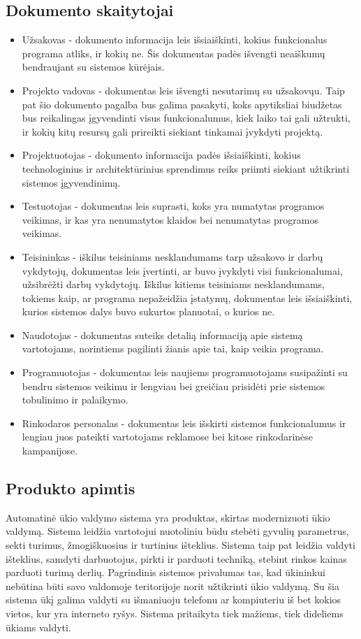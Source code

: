 \documentclass[oneside]{VUMIFPSkursinis}
\begin{document}
\subsection{Dokumento skaitytojai}
\begin{itemize}
	\item Užsakovas - dokumento informacija leis išsiaiškinti, kokius funkcionalus programa atliks, ir kokių ne. Šis dokumentas padės išvengti neaiškumų bendraujant su sistemos kūrėjais.
	\item Projekto vadovas - dokumentas leis išvengti nesutarimų su užsakovųu. Taip pat šio dokumento pagalba bus galima pasakyti, koks apytiksliai biudžetas bus reikalingas įgyvendinti visus funkcionalumus, kiek laiko tai gali užtrukti, ir kokių kitų resursų gali prireikti siekiant tinkamai įvykdyti projektą.
	\item Projektuotojas - dokumento informacija padės išsiaiškinti, kokius technologinius ir architektūrinius sprendimus reiks priimti siekiant užtikrinti sistemos įgyvendinimą.
	\item Testuotojas - dokumentas leis suprasti, koks yra numatytas programos veikimas, ir kas yra nenumatytos klaidos bei nenumatytas programos veikimas.
	\item Teisininkas - iškilus teisiniams nesklandumams tarp užsakovo ir darbų vykdytojų, dokumentas leis įvertinti, ar buvo įvykdyti visi funkcionalumai, užsibrėžti darbų vykdytojų. Iškilus kitiems teisiniams nesklandumams, tokiems kaip, ar programa nepažeidžia įstatymų, dokumentas leis išsiaiškinti, kurios sistemos dalys buvo sukurtos planuotai, o kurios ne.
	\item Naudotojas - dokumentas suteiks detalią informaciją apie sistemą vartotojams, norintiems pagilinti žianis apie tai, kaip veikia programa.
	\item Programuotojas - dokumentas leis naujiems programuotojams susipažinti su bendru sistemos veikimu ir lengviau bei greičiau prisidėti prie sistemos tobulinimo ir palaikymo.
	\item Rinkodaros personalas - dokumentas leis išskirti sistemos funkcionalumus ir lengiau juos pateikti vartotojams reklamose bei kitose rinkodarinėse kampanijose.
\end{itemize}
\pagebreak
\subsection{Produkto apimtis} Automatinė ūkio valdymo sistema yra produktas, skirtas modernizuoti ūkio valdymą. Sistema leidžia vartotojui nuotoliniu būdu stebėti gyvulių parametrus, sekti turimus, žmogiškuosius ir turtinius išteklius. Sistema taip pat leidžia valdyti išteklius, samdyti darbuotojus, pirkti ir parduoti techniką, stebint rinkos kainas parduoti turimą derlių. Pagrindinis sistemos privalumas tas, kad ūkininkui nebūtina būti savo valdomoje teritorijoje norit užtikrinti ūkio valdymą. Su šia sistema ūkį galima valdyti su išmaniuoju telefonu ar kompiuteriu iš bet kokios vietos, kur yra interneto ryšys. Sistema pritaikyta tiek mažiems, tiek dideliems ūkiams valdyti. 
\end{document}
